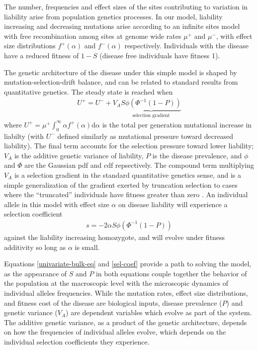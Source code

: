 \documentclass[11pt]{article}
\begin{document}
The number, frequencies and effect sizes of the sites contributing to variation in liability arise from population genetics processes. In our model, liability increasing and decreasing mutations arise according to an infinite sites model with free recombination among sites at genome wide rates $\mu^+$ and $\mu^-$, with effect size distributions $f^+\left(\alpha\right)$ and $f^-\left(\alpha\right)$ respectively. Individuals with the disease have a reduced fitness of $1-S$ (disease free individuals have fitness 1).

The genetic architecture of the disease under this simple model is shaped by mutation-selection-drift balance, and can be related to standard results from quantitative genetics. The steady state is reached when
\begin{align}
  U^+ = U^- + V_A \underbrace{S\phi\left(\Phi^{-1}\left(1-P\right)\right)}_{\text{selection gradient}}
  \label{univariate-bulk-eq}
\end{align}
where $U^+ = \mu^+\int_{0}^{\infty}\alpha f^+\left(\alpha\right)\mathrm{d}\alpha$ is the total per generation mutational increase in liabilty (with $U^-$ defined similarly as mutational pressure toward decreased liability). The final term accounts for the selection pressure toward lower liability; $V_A$ is the additive genetic variance of liability, $P$ is the disease prevalence, and $\phi$ and $\Phi$ are the Gaussian pdf and cdf repsectively. The compound term multiplying $V_A$ is a selection gradient in the standard quantitative genetics sense, and is a simple generalization of the gradient exerted by truncation selection to cases where the ``truncated'' individuals have fitness greater than zero  \cite{Charlesworth}.  An individual allele in this model with effect size $\alpha$ on disease liability will experience a selection coefficient
\begin{align}
  s = -2\alpha S\phi\left(\Phi^{-1}\left(1-P\right)\right)
  \label{sel-coef}
\end{align}
against the liability increasing homozygote, and will evolve under fitness additivity so long as $\alpha$ is small.

Equations \eqref{univariate-bulk-eq} and \eqref{sel-coef} provide a path to solving the model, as the appearance of $S$ and $P$ in both equations couple together the behavior of the population at the macroscopic level with the microscopic dynamics of individual alleles frequencies.  While the mutation rates, effect size distributions, and fitness cost of the disease are biological inputs, disease prevalence ($P$) and genetic variance ($V_A$) are dependent variables which evolve as part of the system. The additive genetic variance, as a product of the genetic architecture, depends on how the frequencies of individual alleles evolve, which depends on the individual selection coefficients they experience.
\end{document}
